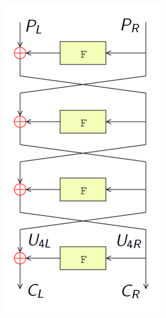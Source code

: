 \documentclass[9pt]{beamer}
\begin{document}
\begin{frame}
\begin{columns}

\begin{column}{0.35\textwidth}
\begin{figure}
\includegraphics[totalheight=0.8\textheight]{DES_4.PNG}
\end{figure}
\end{column}


\end{columns}
\end{frame}
\end{document}
